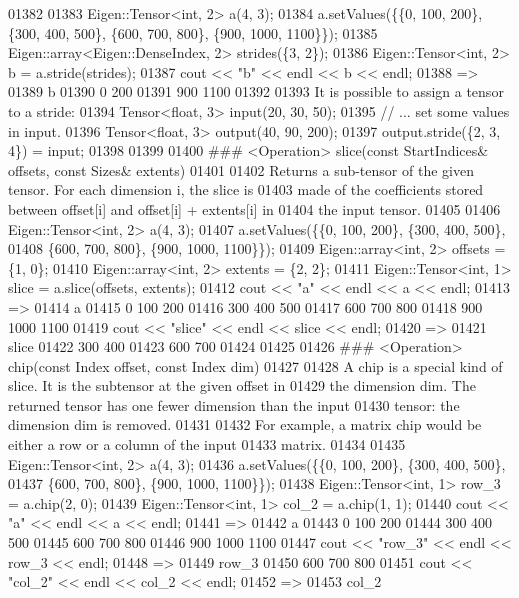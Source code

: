 \begin{DoxyCode}
01382 
01383     Eigen::Tensor<int, 2> a(4, 3);
01384     a.setValues(\{\{0, 100, 200\}, \{300, 400, 500\}, \{600, 700, 800\}, \{900, 1000, 1100\}\});
01385     Eigen::array<Eigen::DenseIndex, 2> strides(\{3, 2\});
01386     Eigen::Tensor<int, 2> b = a.stride(strides);
01387     cout << "b" << endl << b << endl;
01388     =>
01389     b
01390        0   200
01391      900  1100
01392 
01393 It is possible to assign a tensor to a stride:
01394     Tensor<float, 3> input(20, 30, 50);
01395     // ... set some values in input.
01396     Tensor<float, 3> output(40, 90, 200);
01397     output.stride(\{2, 3, 4\}) = input;
01398 
01399 
01400 ### <Operation> slice(const StartIndices& offsets, const Sizes& extents)
01401 
01402 Returns a sub-tensor of the given tensor. For each dimension i, the slice is
01403 made of the coefficients stored between offset[i] and offset[i] + extents[i] in
01404 the input tensor.
01405 
01406     Eigen::Tensor<int, 2> a(4, 3);
01407     a.setValues(\{\{0, 100, 200\}, \{300, 400, 500\},
01408                  \{600, 700, 800\}, \{900, 1000, 1100\}\});
01409     Eigen::array<int, 2> offsets = \{1, 0\};
01410     Eigen::array<int, 2> extents = \{2, 2\};
01411     Eigen::Tensor<int, 1> slice = a.slice(offsets, extents);
01412     cout << "a" << endl << a << endl;
01413     =>
01414     a
01415        0   100   200
01416      300   400   500
01417      600   700   800
01418      900  1000  1100
01419     cout << "slice" << endl << slice << endl;
01420     =>
01421     slice
01422      300   400
01423      600   700
01424 
01425 
01426 ### <Operation> chip(const Index offset, const Index dim)
01427 
01428 A chip is a special kind of slice. It is the subtensor at the given offset in
01429 the dimension dim. The returned tensor has one fewer dimension than the input
01430 tensor: the dimension dim is removed.
01431 
01432 For example, a matrix chip would be either a row or a column of the input
01433 matrix.
01434 
01435     Eigen::Tensor<int, 2> a(4, 3);
01436     a.setValues(\{\{0, 100, 200\}, \{300, 400, 500\},
01437                  \{600, 700, 800\}, \{900, 1000, 1100\}\});
01438     Eigen::Tensor<int, 1> row\_3 = a.chip(2, 0);
01439     Eigen::Tensor<int, 1> col\_2 = a.chip(1, 1);
01440     cout << "a" << endl << a << endl;
01441     =>
01442     a
01443        0   100   200
01444      300   400   500
01445      600   700   800
01446      900  1000  1100
01447     cout << "row\_3" << endl << row\_3 << endl;
01448     =>
01449     row\_3
01450        600   700   800
01451     cout << "col\_2" << endl << col\_2 << endl;
01452     =>
01453     col\_2

\end{DoxyCode}
